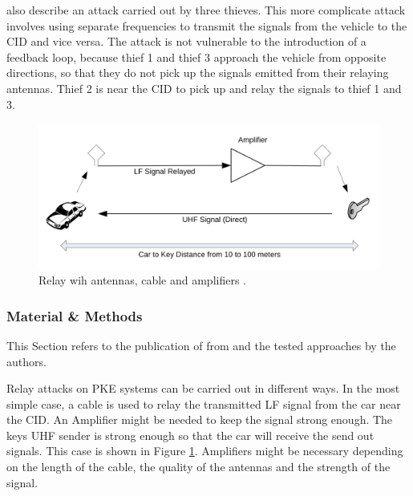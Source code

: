 	\label{par:threeThieves}
	\citeauthor{someAttacksPKES} also describe an attack carried out by three thieves.
	This more complicate attack involves using separate frequencies to transmit the signals
	from the vehicle to the CID and vice versa.
	The attack is not vulnerable to the introduction of a feedback loop,
	because thief 1 and thief 3 approach the vehicle from opposite directions,
	so that they do not pick up the signals emitted from their relaying antennas.
	Thief 2 is near the CID to pick up and relay the signals to thief 1 and 3.

	\begin{figure}[ht!]
		\begin{center}
			\includegraphics[width=\textwidth]{pictures/franc_relay_over_the_wire.png}
		\end{center}
		\caption{Relay wih antennas, cable and amplifiers \citep[p. 5]{relayAttacksFranc}.}
		\label{fig:relayOTW}
	\end{figure}


\subsubsection*{Material \& Methods}
	\label{sec:matmet}
	This Section refers to the publication of \citeauthor{relayAttacksFranc} from \citeyear{relayAttacksFranc}
	and the tested approaches by the authors.

	Relay  attacks on PKE systems can be carried out in different ways.
	In the most simple case,
	a cable is used to relay the transmitted LF signal from the car near the CID.
	An Amplifier might be needed to keep the signal strong enough.
	The keys UHF sender is strong enough so that the car will receive the send out signals.
	This case is shown in Figure \ref{fig:relayOTW}.
	Amplifiers might be necessary depending on the length of the cable,
	the quality of the antennas and the strength of the signal.

